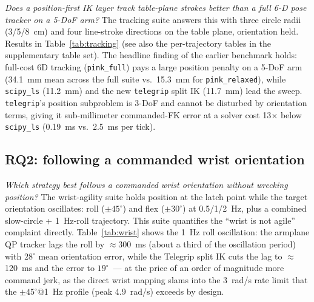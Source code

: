\emph{Does a position-first IK layer track table-plane strokes better than
a full 6-D pose tracker on a 5-DoF arm?} The tracking suite answers this
with three circle radii (3/5/\SI{8}{cm}) and four line-stroke directions on
the table plane, orientation held. Results in
Table~\ref{tab:tracking} (see also the per-trajectory tables in the
supplementary table set). The headline finding of the earlier benchmark holds:
full-cost 6D tracking (\texttt{pink\_full}) pays a large position penalty
on a 5-DoF arm (\SI{34.1}{mm} mean across the full suite vs.\
\SI{15.3}{mm} for \texttt{pink\_relaxed}), while \texttt{scipy\_ls}
(\SI{11.2}{mm}) and the new \texttt{telegrip} split IK (\SI{11.7}{mm})
lead the sweep. \texttt{telegrip}'s position subproblem is 3-DoF and
cannot be disturbed by orientation terms, giving it sub-millimeter
commanded-FK error at a solver cost 13\(\times\) below
\texttt{scipy\_ls} (\SI{0.19}{ms} vs.\ \SI{2.5}{ms} per tick).

\begin{table}[h]
  \centering
  \caption{Tracking suite, representative trajectory
  (\texttt{circle\_r5cm}). Full sweep in the supplementary table set.}
  \label{tab:tracking}
  \small
  
\end{table}

\subsection{RQ2: following a commanded wrist orientation}
\label{sec:exp-wrist}

\emph{Which strategy best follows a commanded wrist orientation without
wrecking position?} The wrist-agility suite holds position at the latch
point while the target orientation oscillates: roll (\(\pm45^\circ\)) and
flex (\(\pm30^\circ\)) at 0.5/1/\SI{2}{Hz}, plus a combined slow-circle +
\SI{1}{Hz}-roll trajectory. This suite quantifies the ``wrist is not
agile'' complaint directly.
Table~\ref{tab:wrist} shows the \SI{1}{Hz} roll oscillation: the armplane
QP tracker lags the roll by \(\approx\)\SI{300}{ms} (about a third of the
oscillation period) with \(28^\circ\) mean orientation error, while the
Telegrip split IK cuts the lag to \(\approx\)\SI{120}{ms} and the error to
\(19^\circ\)~--- at the price of an order of magnitude more command jerk,
as the direct wrist mapping slams into the \SI{3}{rad/s} rate limit that
the \(\pm45^\circ\)@\SI{1}{Hz} profile (peak \SI{4.9}{rad/s}) exceeds by
design.

\begin{table}[h]
  \centering
  \caption{Wrist-agility suite, \SI{1}{Hz} roll oscillation
  (\texttt{wrist\_roll\_f1hz}).}
  \label{tab:wrist}
  \small
  
\end{table}

